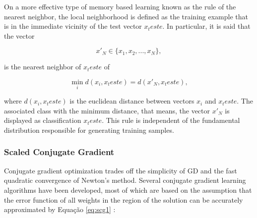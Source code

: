 On a more effective type of memory based learning known as the rule of the nearest neighbor, the local neighborhood is defined as the training example that is in the immediate vicinity of the test vector $x_teste$. In particular, it is said that the vector

\begin{equation}
\label{eq:nearestneighborhood_vector}
x'_N \in \{x_1, x_2, ..., x_N\},
\end{equation}

is the nearest neighbor of $x_teste$ of

\begin{equation}
\label{eq:nearestneighborhood}
\min_i d(x_i, x_teste) = d(x'_N,x_teste),
\end{equation}

where $d(x_i, x_teste)$ is the euclidean distance between vectors $x_i$ and $x_teste$. The associated class with the minimum distance, that means, the vector $x'_N$ is displayed as classification $x_teste$. This rule is independent of the fundamental distribution responsible for generating training samples.

\subsubsection{Scaled Conjugate Gradient}

Conjugate gradient optimization trades off the simplicity of GD and the fast quadratic convergence of Newton's method. Several conjugate gradient learning algorithms have been developed, most of which are based on the assumption that the error function of all weights in the region of the solution can be accurately approximated by  Equação \ref{eq:scg1} \cite{engelbrecht2007computational}:

